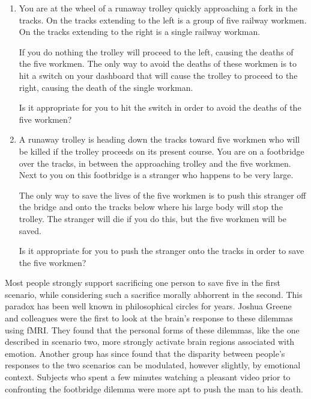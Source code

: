 \documentclass[a4paper,14pt]{extbook}
\begin{document}
\begin{enumerate}
      \item
            You are at the wheel of a runaway trolley quickly approaching a fork in the tracks.
            On the tracks extending to the left is a group of five railway workmen.
            On the tracks extending to the right is a single railway workman.

            If you do nothing the trolley will proceed to the left, causing the deaths of the five workmen.
            The only way to avoid the deaths of these workmen is to hit a switch on your dashboard that will cause the trolley to proceed to the right, causing the death of the single workman.

            Is it appropriate for you to hit the switch in order to avoid the deaths of the five workmen?
      \item
            A runaway trolley is heading down the tracks toward five workmen who will be killed if the trolley proceeds on its present course.
            You are on a footbridge over the tracks, in between the approaching trolley and the five workmen.
            Next to you on this footbridge is a stranger who happens to be very large.

            The only way to save the lives of the five workmen is to push this stranger off the bridge and onto the tracks below where his large body will stop the trolley.
            The stranger will die if you do this, but the five workmen will be saved.

            Is it appropriate for you to push the stranger onto the tracks in order to save the five workmen?

\end{enumerate}

Most people strongly support sacrificing one person to save five in the first scenario, while considering such a sacrifice morally abhorrent in the second.
This paradox has been well known in philosophical circles for years.
Joshua Greene and colleagues were the first to look at the brain's response to these dilemmas using fMRI.
They found that the personal forms of these dilemmas, like the one described in scenario two, more strongly activate brain regions associated with emotion.
Another group has since found that the disparity between people's responses to the two scenarios can be modulated, however slightly, by emotional context.
Subjects who spent a few minutes watching a pleasant video prior to confronting the footbridge dilemma were more apt to push the man to his death.
\end{document}

